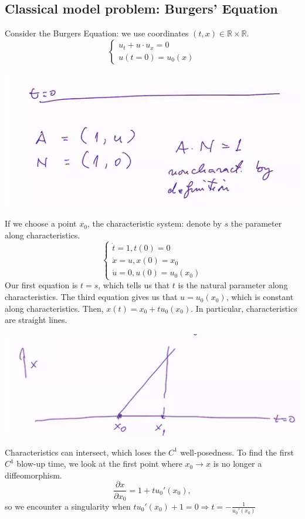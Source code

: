 \documentclass[12pt]{scrartcl}
\newcommand{\R}{\mathbb{R}}
\begin{document}
\subsection{Classical model problem: Burgers' Equation}
Consider the Burgers Equation: we use coordinates $(t, x) \in \R \times \R$.
$$\begin{cases}
u_t + u \cdot u_x = 0\\
u(t = 0) = u_0(x)
\end{cases}$$
 \begin{center}
\includegraphics[scale=0.5]{burger.png}
\end{center}
If we choose a point $x_0$, the characteristic system: denote by $s$ the parameter along characteristics.  
$$\begin{cases}
\dot t = 1, t(0) = 0\\
\dot x = u, x(0) = x_0\\
\dot u = 0, u(0) = u_0(x_0)
\end{cases}$$
Our first equation is $t = s$, which tells us that $t$ is the natural parameter along characteristics.  The third equation gives us that $u = u_0(x_0)$, which is constant along characteristics.  Then, $x(t) = x_0 + tu_0(x_0)$.  In particular, characteristics are straight lines.  
 \begin{center}
\includegraphics[scale=0.5]{intersect.png}
\end{center}
Characteristics can intersect, which loses the $C^1$ well-posedness.  To find the first $C^1$ blow-up time, we look at the first point where $x_0 \rightarrow x$ is no longer a diffeomorphism.  
$$\frac{\partial x}{\partial x_0} = 1 + tu_0'(x_0),$$
so we encounter a singularity when $tu_0'(x_0) + 1 = 0 \Rightarrow t = -\frac{1}{u_0'(x_0)}$
\pagebreak
\end{document}
